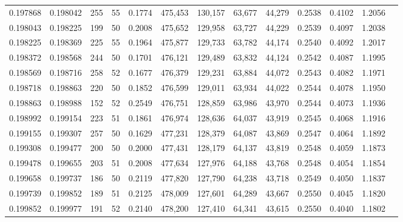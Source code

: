 \begin{tabular}{rrrrrrrrrrrrr}
0.197868 & 0.198042 &   255 &  55 &                                     0.1774 & 475,453 & 130,157 &  63,677 &  44,279 & 0.2538 & 0.4102 & 1.2056 \\
0.198043 & 0.198225 &   199 &  50 &                                     0.2008 & 475,652 & 129,958 &  63,727 &  44,229 & 0.2539 & 0.4097 & 1.2038 \\
0.198225 & 0.198369 &   225 &  55 &                                     0.1964 & 475,877 & 129,733 &  63,782 &  44,174 & 0.2540 & 0.4092 & 1.2017 \\
0.198372 & 0.198568 &   244 &  50 &                                     0.1701 & 476,121 & 129,489 &  63,832 &  44,124 & 0.2542 & 0.4087 & 1.1995 \\
0.198569 & 0.198716 &   258 &  52 &                                     0.1677 & 476,379 & 129,231 &  63,884 &  44,072 & 0.2543 & 0.4082 & 1.1971 \\
0.198718 & 0.198863 &   220 &  50 &                                     0.1852 & 476,599 & 129,011 &  63,934 &  44,022 & 0.2544 & 0.4078 & 1.1950 \\
0.198863 & 0.198988 &   152 &  52 &                                     0.2549 & 476,751 & 128,859 &  63,986 &  43,970 & 0.2544 & 0.4073 & 1.1936 \\
0.198992 & 0.199154 &   223 &  51 &                                     0.1861 & 476,974 & 128,636 &  64,037 &  43,919 & 0.2545 & 0.4068 & 1.1916 \\
0.199155 & 0.199307 &   257 &  50 &                                     0.1629 & 477,231 & 128,379 &  64,087 &  43,869 & 0.2547 & 0.4064 & 1.1892 \\
0.199308 & 0.199477 &   200 &  50 &                                     0.2000 & 477,431 & 128,179 &  64,137 &  43,819 & 0.2548 & 0.4059 & 1.1873 \\
0.199478 & 0.199655 &   203 &  51 &                                     0.2008 & 477,634 & 127,976 &  64,188 &  43,768 & 0.2548 & 0.4054 & 1.1854 \\
0.199658 & 0.199737 &   186 &  50 &                                     0.2119 & 477,820 & 127,790 &  64,238 &  43,718 & 0.2549 & 0.4050 & 1.1837 \\
0.199739 & 0.199852 &   189 &  51 &                                     0.2125 & 478,009 & 127,601 &  64,289 &  43,667 & 0.2550 & 0.4045 & 1.1820 \\
0.199852 & 0.199977 &   191 &  52 &                                     0.2140 & 478,200 & 127,410 &  64,341 &  43,615 & 0.2550 & 0.4040 & 1.1802 \\

\end{tabular}
